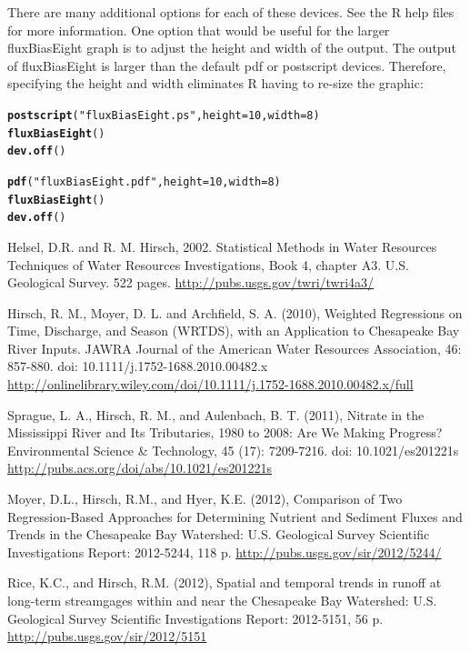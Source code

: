 \documentclass[a4paper,11pt]{article}\usepackage{graphicx, color}
\makeatletter
\newcommand{\hlfunctioncall}[1]{\textcolor[rgb]{0.501960784313725,0,0.329411764705882}{\textbf{#1}}}%
\newcommand{\hlstring}[1]{\textcolor[rgb]{0.6,0.6,1}{#1}}%
\newenvironment{kframe}{%
 \def\at@end@of@kframe{}%
 \ifinner\ifhmode%
  \def\at@end@of@kframe{\end{minipage}}%
  \begin{minipage}{\columnwidth}%
 \fi\fi%
 \def\FrameCommand##1{\hskip\@totalleftmargin \hskip-\fboxsep
 \colorbox{shadecolor}{##1}\hskip-\fboxsep
     \hskip-\linewidth \hskip-\@totalleftmargin \hskip\columnwidth}%
 \MakeFramed {\advance\hsize-\width
   \@totalleftmargin\z@ \linewidth\hsize
   \@setminipage}}%
 {\par\unskip\endMakeFramed%
 \at@end@of@kframe}
\newenvironment{knitrout}{}{} %
\makeatother
\begin{document}
There are many additional options for each of these devices. See the R help files for more information. One option that would be useful for the larger fluxBiasEight graph is to adjust the height and width of the output. The output of fluxBiasEight is larger than the default pdf or postscript devices. Therefore, specifying the height and width eliminates R having to re-size the graphic:

\begin{knitrout}
\color{fgcolor}\begin{kframe}
\begin{alltt}
\hlfunctioncall{postscript}(\hlstring{"fluxBiasEight.ps"}, height=10,width=8)
\hlfunctioncall{fluxBiasEight}()
\hlfunctioncall{dev.off}()

\hlfunctioncall{pdf}(\hlstring{"fluxBiasEight.pdf"}, height=10,width=8)
\hlfunctioncall{fluxBiasEight}()
\hlfunctioncall{dev.off}()

\end{alltt}
\end{kframe}
\end{knitrout}




\clearpage
\begin{thebibliography}{10}

Helsel, D.R. and R. M. Hirsch, 2002. Statistical Methods in Water Resources Techniques of Water Resources Investigations, Book 4, chapter A3. U.S. Geological Survey. 522 pages. \url{http://pubs.usgs.gov/twri/twri4a3/}

Hirsch, R. M., Moyer, D. L. and Archfield, S. A. (2010), Weighted Regressions on Time, Discharge, and Season (WRTDS), with an Application to Chesapeake Bay River Inputs. JAWRA Journal of the American Water Resources Association, 46: 857-880. doi: 10.1111/j.1752-1688.2010.00482.x \url{http://onlinelibrary.wiley.com/doi/10.1111/j.1752-1688.2010.00482.x/full}

Sprague, L. A., Hirsch, R. M., and Aulenbach, B. T. (2011), Nitrate in the Mississippi River and Its Tributaries, 1980 to 2008: Are We Making Progress? Environmental Science \& Technology, 45 (17): 7209-7216. doi: 10.1021/es201221s \url{http://pubs.acs.org/doi/abs/10.1021/es201221s}

Moyer, D.L., Hirsch, R.M., and Hyer, K.E. (2012), Comparison of Two Regression-Based Approaches for Determining Nutrient and Sediment Fluxes and Trends in the Chesapeake Bay Watershed: U.S. Geological Survey Scientific Investigations Report: 2012-5244, 118 p. \url{http://pubs.usgs.gov/sir/2012/5244/}

Rice, K.C., and Hirsch, R.M. (2012), Spatial and temporal trends in runoff at long-term streamgages within and near the Chesapeake Bay Watershed: U.S. Geological Survey Scientific Investigations Report: 2012-5151, 56 p. \url{http://pubs.usgs.gov/sir/2012/5151}


\end{thebibliography}
\end{document}
